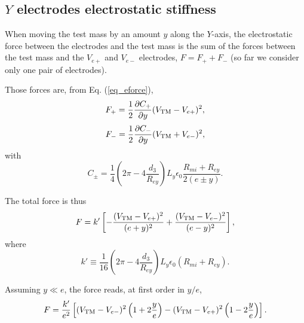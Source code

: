 \documentclass[12pt]{iopart}
\begin{document}
\subsection{$Y$ electrodes electrostatic stiffness}

When moving the test mass by an amount $y$ along the $Y$-axis, the electrostatic force between the electrodes and the test mass is the sum of the forces between the test mass and the $V_{e+}$ and $V_{e-}$ electrodes, $F=F_+ + F_-$ (so far we consider only one pair of electrodes).

Those forces are, from Eq. (\ref{eq_eforce}),
\begin{equation}
F_+ = \frac{1}{2} \frac{\partial C_+}{\partial y} (V_{\rm TM} - V_{e+})^2,
\end{equation}
\begin{equation}
F_- = \frac{1}{2} \frac{\partial C_-}{\partial y} (V_{\rm TM} + V_{e-})^2,
\end{equation}
with
\begin{equation}
C_\pm = \frac{1}{4} \left(2\pi - 4 \frac{d_3}{R_{ey}}\right) L_y \epsilon_0 \frac{R_{mi} + R_{ey}}{2 (e \pm y)}.
\end{equation}

The total force is thus
\begin{equation}
F = k' \left[ -\frac{(V_{\rm TM} - V_{e+})^2}{(e+y)^2} + \frac{(V_{\rm TM} - V_{e-})^2}{(e-y)^2} \right],
\end{equation}
where
\begin{equation} \label{eq_kp}
k' \equiv \frac{1}{16} \left(2\pi - 4 \frac{d_3}{R_{ey}}\right) L_y \epsilon_0 (R_{mi} + R_{ey}).
\end{equation}

Assuming $y \ll e$, the force reads, at first order in $y/e$,
\begin{equation}
F = \frac{k'}{e^2} \left[ (V_{\rm TM} - V_{e-})^2 \left( 1+ 2\frac{y}{e}\right) - (V_{\rm TM} - V_{e+})^2 \left( 1-2\frac{y}{e}\right)\right].
\end{equation}
\end{document}
